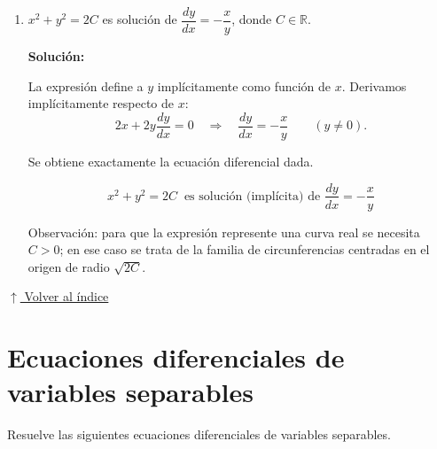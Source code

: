 \documentclass[12pt]{article}
\newcommand{\solucion}{%
    \vspace{0.8em}%
    \textbf{Solución:}%
}
\newcommand{\volverindice}{%
    \vspace{1em}%
    \begin{flushright}%
        \hyperlink{indice}{\small $\uparrow$ Volver al índice}%
    \end{flushright}%
}
\begin{document}
\begin{enumerate}[label=\alph*.-]
    \item $x^2+y^2=2C$ es solución de $\dfrac{dy}{dx}=-\dfrac xy$, donde
    $C\in\mathbb{R}$.

    \solucion

    La expresión define a $y$ implícitamente como función de $x$.
    Derivamos implícitamente respecto de $x$:
    \[
    2x+2y\frac{dy}{dx}=0
    \quad\Rightarrow\quad
    \frac{dy}{dx}=-\frac{x}{y}\qquad(y\neq0).
    \]

    Se obtiene exactamente la ecuación diferencial dada.

    \[
    \boxed{
    x^2+y^2=2C\ \text{ es solución (implícita) de } \frac{dy}{dx}=-\frac xy
    }
    \]

    Observación: para que la expresión represente una curva real se
    necesita $C>0$; en ese caso se trata de la familia de circunferencias
    centradas en el origen de radio $\sqrt{2C}$.

\end{enumerate}

\volverindice
\newpage


\section{Ecuaciones diferenciales de variables separables}

Resuelve las siguientes ecuaciones diferenciales de variables
separables.
\end{document}
